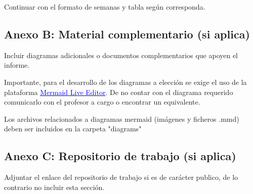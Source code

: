 \documentclass[12pt, a4paper]{article}
\begin{document}
Continuar con el formato de semanas y tabla según corresponda.

\subsection*{Anexo B: Material complementario (si aplica)}
Incluir diagramas adicionales o documentos complementarios que apoyen el informe. 

Importante, para el desarrollo de los diagramas a elección se exige el uso de la plataforma \href{https://mermaid.live/}{\textcolor{blue}{Mermaid Live Editor}}. De no contar con el diagrama requerido comunicarlo con el profesor a cargo o encontrar un equivalente.

Los archivos relacionados a diagramas mermaid (imágenes y ficheros .mmd) deben ser incluidos en la carpeta "diagrams"


\subsection*{Anexo C: Repositorio de trabajo (si aplica)}

Adjuntar el enlace del repositorio de trabajo si es de carácter publico, de lo contrario no incluir esta sección.
\end{document}
